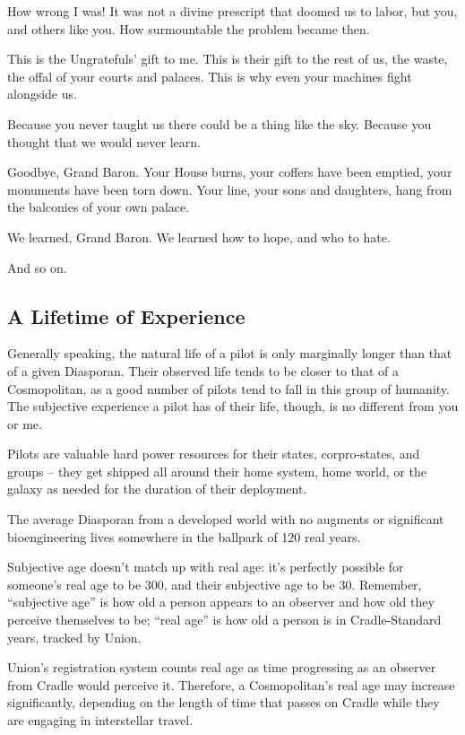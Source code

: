 {How wrong I was! It was not a divine prescript that doomed us to labor, but you, and others like
you. How surmountable the problem became then.

This is the Ungratefuls’ gift to me. This is their gift to the rest of us, the waste, the offal of your
courts and palaces. This is why even your machines fight alongside us.

Because you never taught us there could be a thing like the sky. Because you thought that we
would never learn.

Goodbye, Grand Baron. Your House burns, your coffers have been emptied, your monuments
have been torn down. Your line, your sons and daughters, hang from the balconies of your own
palace.

We learned, Grand Baron. We learned how to hope, and who to hate.}

And so on.

\subsection{A Lifetime of Experience}

Generally speaking, the natural life of a pilot is only marginally longer than that of a given
Diasporan. Their observed life tends to be closer to that of a Cosmopolitan, as a good number of
pilots tend to fall in this group of humanity. The subjective experience a pilot has of their life,
though, is no different from you or me.

Pilots are valuable hard power resources for their states, corpro-states, and groups -- they get
shipped all around their home system, home world, or the galaxy as needed for the duration of
their deployment.

The average Diasporan from a developed world with no augments or significant bioengineering
lives somewhere in the ballpark of 120 real years.

Subjective age doesn’t match up with real age: it’s perfectly possible for someone’s real age to
be 300, and their subjective age to be 30. Remember, “subjective age” is how old a person
appears to an observer and how old they perceive themselves to be; “real age” is how old a
person is in Cradle-Standard years, tracked by Union.

Union’s registration system counts real age as time progressing as an observer from Cradle
would perceive it. Therefore, a Cosmopolitan’s real age may increase significantly, depending on
the length of time that passes on Cradle while they are engaging in interstellar travel.

